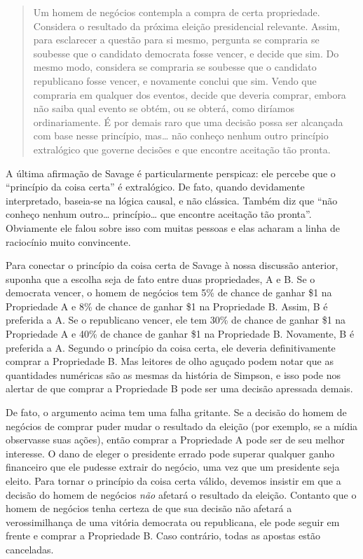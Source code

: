 \documentclass[11pt,a5paper,twoside]{book}
\begin{document}
\begin{quote}
Um homem de negócios contempla a compra de certa propriedade. Considera o resultado da próxima eleição presidencial relevante. Assim, para esclarecer a questão para si mesmo, pergunta se compraria se soubesse que o candidato democrata fosse vencer, e decide que sim. Do mesmo modo, considera se compraria se soubesse que o candidato republicano fosse vencer, e novamente conclui que sim. Vendo que compraria em qualquer dos eventos, decide que deveria comprar, embora não saiba qual evento se obtém, ou se obterá, como diríamos ordinariamente. É por demais raro que uma decisão possa ser alcançada com base nesse princípio, mas… não conheço nenhum outro princípio extralógico que governe decisões e que encontre aceitação tão pronta.
\end{quote}
A última afirmação de Savage é particularmente perspicaz: ele percebe que o “princípio da coisa certa” é extralógico. De fato, quando devidamente interpretado, baseia-se na lógica causal, e não clássica. Também diz que “não conheço nenhum outro… princípio… que encontre aceitação tão pronta”. Obviamente ele falou sobre isso com muitas pessoas e elas acharam a linha de raciocínio muito convincente.

Para conectar o princípio da coisa certa de Savage à nossa discussão anterior, suponha que a escolha seja de fato entre duas propriedades, A e B. Se o democrata vencer, o homem de negócios tem 5\% de chance de ganhar \$1 na Propriedade A e 8\% de chance de ganhar \$1 na Propriedade B. Assim, B é preferida a A. Se o republicano vencer, ele tem 30\% de chance de ganhar \$1 na Propriedade A e 40\% de chance de ganhar \$1 na Propriedade B. Novamente, B é preferida a A. Segundo o princípio da coisa certa, ele deveria definitivamente comprar a Propriedade B. Mas leitores de olho aguçado podem notar que as quantidades numéricas são as mesmas da história de Simpson, e isso pode nos alertar de que comprar a Propriedade B pode ser uma decisão apressada demais.

De fato, o argumento acima tem uma falha gritante. Se a decisão do homem de negócios de comprar puder mudar o resultado da eleição (por exemplo, se a mídia observasse suas ações), então comprar a Propriedade A pode ser de seu melhor interesse. O dano de eleger o presidente errado pode superar qualquer ganho financeiro que ele pudesse extrair do negócio, uma vez que um presidente seja eleito. Para tornar o princípio da coisa certa válido, devemos insistir em que a decisão do homem de negócios \textit{não} afetará o resultado da eleição. Contanto que o homem de negócios tenha certeza de que sua decisão não afetará a verossimilhança de uma vitória democrata ou republicana, ele pode seguir em frente e comprar a Propriedade B. Caso contrário, todas as apostas estão canceladas.
\end{document}
